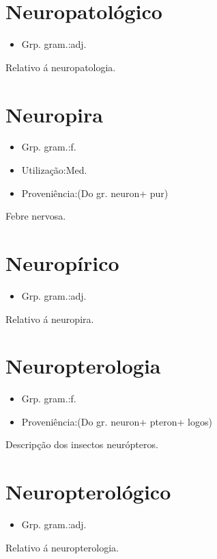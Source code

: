 \section{Neuropatológico}
\begin{itemize}
\item {Grp. gram.:adj.}
\end{itemize}
Relativo á neuropatologia.
\section{Neuropira}
\begin{itemize}
\item {Grp. gram.:f.}
\end{itemize}
\begin{itemize}
\item {Utilização:Med.}
\end{itemize}
\begin{itemize}
\item {Proveniência:(Do gr. \textunderscore neuron\textunderscore  + \textunderscore pur\textunderscore )}
\end{itemize}
Febre nervosa.
\section{Neuropírico}
\begin{itemize}
\item {Grp. gram.:adj.}
\end{itemize}
Relativo á neuropira.
\section{Neuropterologia}
\begin{itemize}
\item {Grp. gram.:f.}
\end{itemize}
\begin{itemize}
\item {Proveniência:(Do gr. \textunderscore neuron\textunderscore  + \textunderscore pteron\textunderscore  + \textunderscore logos\textunderscore )}
\end{itemize}
Descripção dos insectos neurópteros.
\section{Neuropterológico}
\begin{itemize}
\item {Grp. gram.:adj.}
\end{itemize}
Relativo á neuropterologia.
